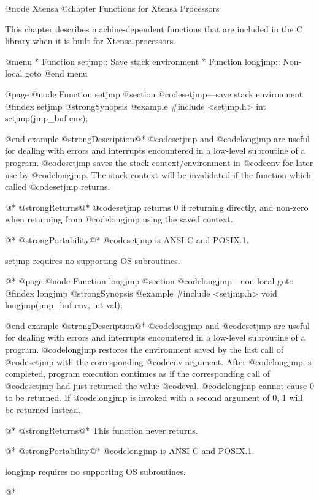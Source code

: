 @node Xtensa
@chapter Functions for Xtensa Processors

This chapter describes machine-dependent functions that are included
in the C library when it is built for Xtensa processors.

@menu
* Function setjmp::      Save stack environment
* Function longjmp::     Non-local goto
@end menu

@page
@node Function setjmp
@section @code{setjmp}---save stack environment
@findex setjmp
@strong{Synopsis}
@example
#include <setjmp.h>
int setjmp(jmp_buf env);

@end example
@strong{Description}@*
@code{setjmp} and @code{longjmp} are useful for dealing with errors
and interrupts encountered in a low-level subroutine of a program.
@code{setjmp} saves the stack context/environment in @code{env} for
later use by @code{longjmp}.  The stack context will be invalidated if
the function which called @code{setjmp} returns.

@*
@strong{Returns}@*
@code{setjmp} returns 0 if returning directly, and non-zero when
returning from @code{longjmp} using the saved context.

@*
@strong{Portability}@*
@code{setjmp} is ANSI C and POSIX.1.

setjmp requires no supporting OS subroutines.

@*
@page
@node Function longjmp
@section @code{longjmp}---non-local goto
@findex longjmp
@strong{Synopsis}
@example
#include <setjmp.h>
void longjmp(jmp_buf env, int val);

@end example
@strong{Description}@*
@code{longjmp} and @code{setjmp} are useful for dealing with errors
and interrupts encountered in a low-level subroutine of a program.
@code{longjmp} restores the environment saved by the last call of
@code{setjmp} with the corresponding @code{env} argument.  After
@code{longjmp} is completed, program execution continues as if the
corresponding call of @code{setjmp} had just returned the value
@code{val}.  @code{longjmp} cannot cause 0 to be returned.  If
@code{longjmp} is invoked with a second argument of 0, 1 will be
returned instead.

@*
@strong{Returns}@*
This function never returns.

@*
@strong{Portability}@*
@code{longjmp} is ANSI C and POSIX.1.

longjmp requires no supporting OS subroutines.

@*
